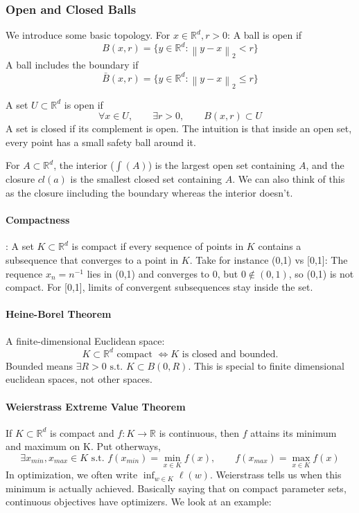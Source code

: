\documentclass[12pt,oneside]{book}
\numberwithin{equation}{section}
\theoremstyle{definition}
\theoremstyle{plain}
\theoremstyle{remark}
\newcommand{\R}{\mathbb{R}}
\newcommand{\norm}[1]{\left\lVert #1 \right\rVert}
\begin{document}
\subsubsection{Open and Closed Balls}
We introduce some basic topology. For $x \in \R^d, r > 0$:
A ball is open if \[B(x,r)=\{y \in \R^d: \norm{y-x}_2 < r\}\]
A ball includes the boundary if \[\bar{B}(x,r)=\{y \in \R^d: \norm{y-x}_2 \le r\}\]

A set $U \subset \R^d$ is open if \[\forall x \in U, \qquad \exists r > 0, \qquad B(x,r) \subset U\] A set is closed if its complement is open. The intuition is that inside an open set, every point has a small safety ball around it.

For $A \subset \R^d$, the interior ($\int(A)$) is the largest open set containing $A$, and the closure $cl(a)$ is the smallest closed set containing $A$. We can also think of this as the closure iincluding the boundary whereas the interior doesn't.

\paragraph{Compactness}: A set $K \subset \R^d$ is compact if every sequence of points in $K$ contains a subsequence that converges to a point in $K$. Take for instance (0,1) vs [0,1]:
The requence $x_n = n^{-1}$ lies in (0,1) and converges to 0, but $0 \notin (0,1)$, so (0,1) is not compact. For [0,1], limits of convergent subsequences stay inside the set.

\paragraph{Heine-Borel Theorem} A finite-dimensional Euclidean space: \[K \subset \R^d \text{ compact } \iff K \text{ is closed and bounded.}\] Bounded means $ \exists R > 0 \text{ s.t. } K \subset B(0,R)$. This is special to finite dimensional euclidean spaces, not other spaces.

\paragraph{Weierstrass Extreme Value Theorem} If $K \subset \R^d$ is compact and $f:K \rightarrow \R$ is continuous, then $f$ attains its minimum and maximum on K. Put otherways, \[\exists x_{min}, x_{max} \in K \text{ s.t. } f(x_{min})=\min_{x \in K} f(x), \qquad f(x_{max})=\max_{x \in K} f(x)\] In optimization, we often write $\inf_{w \in K} \ell (w)$. Weierstrass tells us when this minimum is actually achieved. Basically saying that on compact parameter sets, continuous objectives have optimizers. We look at an example:
\end{document}
